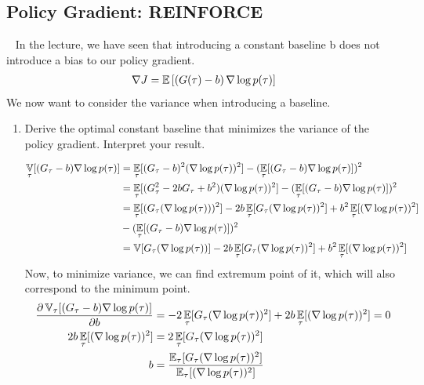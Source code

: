 \documentclass{exam}
\begin{document}
\subsection{Policy Gradient: REINFORCE}
\ \newline
In the lecture, we have seen that introducing a constant baseline b does not introduce a bias to our policy gradient.
\begin{align*}
    \nabla J = \operatorname*{\mathbb{E}}\left[\left(G(\tau) - b\right) \nabla \log p(\tau) \right]
\end{align*}
We now want to consider the variance when introducing a baseline.
\begin{enumerate}
    \item Derive the optimal constant baseline that minimizes the variance of the policy gradient. Interpret your result.
    \begin{solutionorlines}[2in]
    \begin{align*}
        \operatorname*{\mathbb{V}}_{\tau}[(G_{\tau} - b) \nabla \log p(\tau)] &= \operatorname*{\mathbb{E}}_{\tau}[(G_{\tau} - b)^2 (\nabla \log p(\tau))^2] - (\operatorname*{\mathbb{E}}_{\tau}[(G_{\tau} - b) \nabla \log p(\tau)])^2\\
        &=  \operatorname*{\mathbb{E}}_{\tau}[(G_{\tau}^2 - 2 b G_{\tau} + b^2) (\nabla \log p(\tau))^2] - (\operatorname*{\mathbb{E}}_{\tau}[(G_{\tau} - b) \nabla \log p(\tau)])^2\\
        &= \operatorname*{\mathbb{E}}_{\tau}[(G_{\tau} (\nabla \log p(\tau)))^2] - 2b \operatorname*{\mathbb{E}}_{\tau}[G_{\tau} (\nabla \log p(\tau))^2] + b^2\operatorname*{\mathbb{E}}_{\tau}[(\nabla \log p(\tau))^2]\\
        &- (\operatorname*{\mathbb{E}}_{\tau}[(G_{\tau} - b) \nabla \log p(\tau)])^2\\
        &= \operatorname*{\mathbb{V}}[G_{\tau} (\nabla \log p(\tau))] - 2b \operatorname*{\mathbb{E}}_{\tau}[G_{\tau} (\nabla \log p(\tau))^2] + b^2\operatorname*{\mathbb{E}}_{\tau}[(\nabla \log p(\tau))^2]\\
    \end{align*}
    Now, to minimize variance, we can find extremum point of it, which will also correspond to the minimum point.
    \begin{align*}
        \frac{\partial\variance_{\tau}[(G_{\tau} - b) \nabla \log p(\tau)]}{\partial b} &= -2 \expectation_{\tau}[G_{\tau} (\nabla \log p(\tau))^2] + 2b\expectation_{\tau}[(\nabla \log p(\tau))^2]=0\\
        2b\expectation_{\tau}[(\nabla \log p(\tau))^2] &= 2 \expectation_{\tau}[G_{\tau} (\nabla \log p(\tau))^2]\\
        b &= \frac{\expectation_{\tau}[G_{\tau} (\nabla \log p(\tau))^2]}{\expectation_{\tau}[(\nabla \log p(\tau))^2]}

\end{align*}
\end{solutionorlines}
\end{enumerate}
\end{document}
